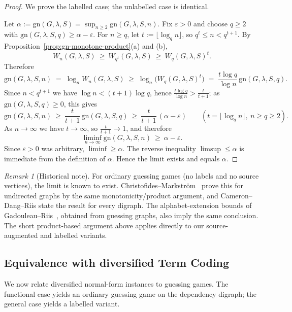 \documentclass[11pt]{article}
\theoremstyle{plain}
\theoremstyle{definition}
\theoremstyle{definition}
\theoremstyle{remark}
\newtheorem{remark}[theorem]{Remark}
\newcommand{\gn}{\mathrm{gn}}
\begin{document}
\begin{proof}
We prove the labelled case; the unlabelled case is identical.

Let
\(
  \alpha:=\gn(G,\lambda,S)=\sup_{n\ge 2}\gn(G,\lambda,S,n).
\)
Fix $\varepsilon>0$ and choose $q\ge 2$ with
\(
  \gn(G,\lambda,S,q)\ge \alpha-\varepsilon.
\)
For $n\ge q$, let $t:=\lfloor \log_q n\rfloor$, so $q^t\le n<q^{t+1}$.
By Proposition~\ref{prop:gn-monotone-product}(a) and (b),
\[
  W_n(G,\lambda,S)\ \ge\ W_{q^t}(G,\lambda,S)\ \ge\ W_q(G,\lambda,S)^t.
\]
Therefore
\[
  \gn(G,\lambda,S,n)
  \;=\;
  \log_n W_n(G,\lambda,S)
  \;\ge\;
  \log_n\bigl(W_q(G,\lambda,S)^t\bigr)
  \;=\;
  \frac{t\log q}{\log n}\,\gn(G,\lambda,S,q).
\]
Since $n<q^{t+1}$ we have $\log n<(t+1)\log q$, hence $\frac{t\log q}{\log n}>\frac{t}{t+1}$;
as $\gn(G,\lambda,S,q)\ge 0$, this gives
\begin{equation}\label{eq:gn-floorlog}
  \gn(G,\lambda,S,n)\ \ge\ \frac{t}{t+1}\,\gn(G,\lambda,S,q)
  \ \ge\ \frac{t}{t+1}\,(\alpha-\varepsilon)\qquad(t=\lfloor\log_q n\rfloor,\ n\ge q\ge 2).
\end{equation}
As $n\to\infty$ we have $t\to\infty$, so $\frac{t}{t+1}\to 1$, and therefore
\[
  \liminf_{n\to\infty}\gn(G,\lambda,S,n)\ \ge\ \alpha-\varepsilon.
\]
Since $\varepsilon>0$ was arbitrary, $\liminf\ge \alpha$.
The reverse inequality $\limsup\le \alpha$ is immediate from the definition of $\alpha$.
Hence the limit exists and equals $\alpha$.
\end{proof}

\begin{remark}[Historical note]
For ordinary guessing games (no labels and no source vertices), the limit is known to exist.
Christofides--Markstr\"om~\cite[Theorem~3.6]{christofides2011guessing} prove this for
undirected graphs by the same monotonicity/product argument, and Cameron--Dang--Riis
\cite{cameron2016guessing} state the result for every digraph. The alphabet-extension bounds
of Gadouleau--Riis~\cite[Corollary~3]{gadouleau2011graph}, obtained from guessing graphs,
also imply the same conclusion.
The short product-based argument above applies directly to our source-augmented and labelled variants.
\end{remark}

\subsection{Equivalence with diversified Term Coding}

We now relate diversified normal-form instances to guessing games.
The functional case yields an ordinary guessing game on the dependency digraph; the general case yields a labelled
variant.
\end{document}
